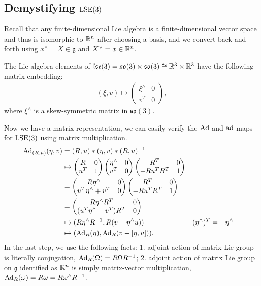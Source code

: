 \documentclass[12pt,class=article,crop=false]{standalone}
\begin{document}
\subsection{Demystifying $ \operatorname{LSE}(3)$}

Recall that any finite-dimensional Lie algebra is a finite-dimensional vector space and thus is isomorphic to $ \mathbb{R}^{n}$ after choosing a basis, and we convert back and forth using $ x^\wedge = X \in \mathfrak{g} $ and $ X^\vee = x \in \mathbb{R}^{n}$. 

The Lie algebra elements of $ \mathfrak{lse}(3) = \mathfrak{so}(3) \ltimes \mathfrak{so}(3) \cong \mathbb{R}^3 \ltimes \mathbb{R}^3$ have the following matrix embedding:
\begin{align*}
	(\xi, v) \mapsto \begin{pmatrix} \xi^\wedge & 0\\ v^{T}&0 \end{pmatrix} ,
\end{align*}
where $ \xi^\wedge $ is a skew-symmetric matrix in $ \mathfrak{so}(3) $.

Now we have a matrix representation, we can easily verify the $ \operatorname{Ad}$ and  $ \operatorname{ad}$ maps for $ \operatorname{LSE}(3)$ using matrix multiplication.
\begin{align*}
	\operatorname{Ad}_{ (R,u)}( \eta,v)  &= (R,u) * (\eta,v) * (R,u)^{-1}   \\
			       &\mapsto \begin{pmatrix} R&0\\ u^{T} &1 \end{pmatrix}\begin{pmatrix} \eta^\wedge & 0 \\ v^{T}&0 \end{pmatrix}   \begin{pmatrix} R^{T}& 0\\ - Ru^{T}R^{T} & 1 \end{pmatrix}  \\
			       &= \begin{pmatrix} R \eta^\wedge & 0\\ u^{T} \eta^\wedge + v^{T} & 0 \end{pmatrix} \begin{pmatrix} R^{T}&0\\- Ru^{T}R^{T}&1 \end{pmatrix}  \\
			       &= \begin{pmatrix} R \eta^\wedge R^{T} & 0 \\ (u^{T} \eta^\wedge + v^{T})R^{T}&0\end{pmatrix}  \\
			       &\mapsto  (R \eta^\wedge R^{-1}, R(v - \eta^\wedge u)) && (\eta^\wedge )^{T} = - \eta^\wedge \\
			       &\mapsto  ( \operatorname{Ad}_{ R}( \eta  ), \operatorname{Ad}_{ R}( v - [\eta,u])) .
\end{align*}
In the last step, we use the following facts: 1. adjoint action of matrix Lie group is literally conjugation, $ \operatorname{Ad}_{ R}( \Omega) = R\Omega R^{-1}$;  2. adjoint action of matrix Lie group on $ \mathfrak{g} $ identified as $ \mathbb{R}^{n}$ is simply matrix-vector multiplication, $ \operatorname{Ad}_{ R}( \omega) = R \omega = R \omega^\wedge R^{-1} $.
\end{document}
